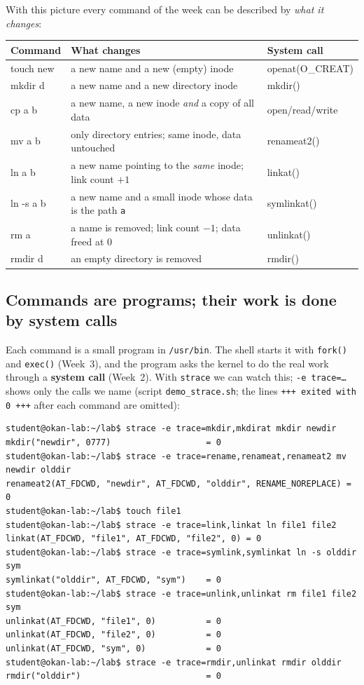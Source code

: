 \documentclass[11pt,a4paper]{article}
\newcommand{\term}[1]{\textbf{\color{mintdeep}#1}}
\newcommand{\cmd}[1]{\texttt{#1}}
\begin{document}
With this picture every command of the week can be described by \emph{what it changes}:

\begin{center}
\renewcommand{\arraystretch}{1.25}
\begin{tabularx}{\linewidth}{>{\ttfamily}l >{\raggedright\arraybackslash}X >{\ttfamily}l}
\toprule
\textrm{\textbf{Command}} & \textbf{What changes} & \textrm{\textbf{System call}} \\
\midrule
touch new & a new name and a new (empty) inode & openat(O\_CREAT) \\
mkdir d & a new name and a new directory inode & mkdir() \\
cp a b & a new name, a new inode \emph{and} a copy of all data & open/read/write \\
mv a b & only directory entries; same inode, data untouched & renameat2() \\
ln a b & a new name pointing to the \emph{same} inode; link count $+1$ & linkat() \\
ln -s a b & a new name and a small inode whose data is the path \texttt{a} & symlinkat() \\
rm a & a name is removed; link count $-1$; data freed at $0$ & unlinkat() \\
rmdir d & an empty directory is removed & rmdir() \\
\bottomrule
\end{tabularx}
\end{center}

\subsection{Commands are programs; their work is done by system calls}

Each command is a small program in \texttt{/usr/bin}. The shell starts it with \cmd{fork()} and \cmd{exec()} (Week~3), and the program asks the kernel to do the real work through a \term{system call} (Week~2). With \cmd{strace} we can watch this; \cmd{-e trace=\dots} shows only the calls we name (script \cmd{demo\_strace.sh}; the lines \texttt{+++ exited with 0 +++} after each command are omitted):

\begin{lstlisting}[style=term]
student@okan-lab:~/lab$ strace -e trace=mkdir,mkdirat mkdir newdir
mkdir("newdir", 0777)                   = 0
student@okan-lab:~/lab$ strace -e trace=rename,renameat,renameat2 mv newdir olddir
renameat2(AT_FDCWD, "newdir", AT_FDCWD, "olddir", RENAME_NOREPLACE) = 0
student@okan-lab:~/lab$ touch file1
student@okan-lab:~/lab$ strace -e trace=link,linkat ln file1 file2
linkat(AT_FDCWD, "file1", AT_FDCWD, "file2", 0) = 0
student@okan-lab:~/lab$ strace -e trace=symlink,symlinkat ln -s olddir sym
symlinkat("olddir", AT_FDCWD, "sym")    = 0
student@okan-lab:~/lab$ strace -e trace=unlink,unlinkat rm file1 file2 sym
unlinkat(AT_FDCWD, "file1", 0)          = 0
unlinkat(AT_FDCWD, "file2", 0)          = 0
unlinkat(AT_FDCWD, "sym", 0)            = 0
student@okan-lab:~/lab$ strace -e trace=rmdir,unlinkat rmdir olddir
rmdir("olddir")                         = 0
\end{lstlisting}
\end{document}
